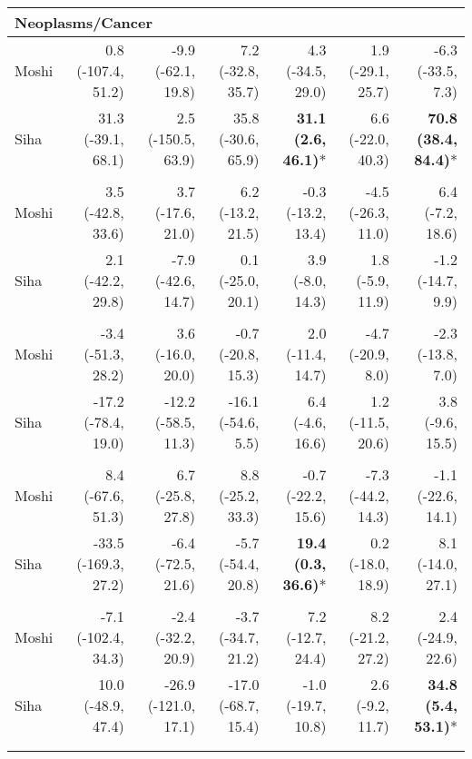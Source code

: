 \begin{table}[t]
\begin{tabular*}{\linewidth}{@{\extracolsep{\fill}}l|rrrrrr}
\multicolumn{7}{l}{Neoplasms/Cancer} \\[2.5pt] 
\midrule\addlinespace[2.5pt]
Moshi & 0.8 (-107.4, 51.2) & -9.9 (-62.1, 19.8) & 7.2 (-32.8, 35.7) & 4.3 (-34.5, 29.0) & 1.9 (-29.1, 25.7) & -6.3 (-33.5, 7.3) \\ 
Siha & 31.3 (-39.1, 68.1) & 2.5 (-150.5, 63.9) & 35.8 (-30.6, 65.9) & \textbf{31.1 (2.6, 46.1)}* & 6.6 (-22.0, 40.3) & \textbf{70.8 (38.4, 84.4)}* \\ 
\midrule\addlinespace[2.5pt]
\multicolumn{7}{l}{Other Cardiovascular Diseases} \\[2.5pt] 
\midrule\addlinespace[2.5pt]
Moshi & 3.5 (-42.8, 33.6) & 3.7 (-17.6, 21.0) & 6.2 (-13.2, 21.5) & -0.3 (-13.2, 13.4) & -4.5 (-26.3, 11.0) & 6.4 (-7.2, 18.6) \\ 
Siha & 2.1 (-42.2, 29.8) & -7.9 (-42.6, 14.7) & 0.1 (-25.0, 20.1) & 3.9 (-8.0, 14.3) & 1.8 (-5.9, 11.9) & -1.2 (-14.7, 9.9) \\ 
\midrule\addlinespace[2.5pt]
\multicolumn{7}{l}{Mild/Moderate Anemia} \\[2.5pt] 
\midrule\addlinespace[2.5pt]
Moshi & -3.4 (-51.3, 28.2) & 3.6 (-16.0, 20.0) & -0.7 (-20.8, 15.3) & 2.0 (-11.4, 14.7) & -4.7 (-20.9, 8.0) & -2.3 (-13.8, 7.0) \\ 
Siha & -17.2 (-78.4, 19.0) & -12.2 (-58.5, 11.3) & -16.1 (-54.6, 5.5) & 6.4 (-4.6, 16.6) & 1.2 (-11.5, 20.6) & 3.8 (-9.6, 15.5) \\ 
\midrule\addlinespace[2.5pt]
\multicolumn{7}{l}{Caries} \\[2.5pt] 
\midrule\addlinespace[2.5pt]
Moshi & 8.4 (-67.6, 51.3) & 6.7 (-25.8, 27.8) & 8.8 (-25.2, 33.3) & -0.7 (-22.2, 15.6) & -7.3 (-44.2, 14.3) & -1.1 (-22.6, 14.1) \\ 
Siha & -33.5 (-169.3, 27.2) & -6.4 (-72.5, 21.6) & -5.7 (-54.4, 20.8) & \textbf{19.4 (0.3, 36.6)}* & 0.2 (-18.0, 18.9) & 8.1 (-14.0, 27.1) \\ 
\midrule\addlinespace[2.5pt]
\multicolumn{7}{l}{Poisoning} \\[2.5pt] 
\midrule\addlinespace[2.5pt]
Moshi & -7.1 (-102.4, 34.3) & -2.4 (-32.2, 20.9) & -3.7 (-34.7, 21.2) & 7.2 (-12.7, 24.4) & 8.2 (-21.2, 27.2) & 2.4 (-24.9, 22.6) \\ 
Siha & 10.0 (-48.9, 47.4) & -26.9 (-121.0, 17.1) & -17.0 (-68.7, 15.4) & -1.0 (-19.7, 10.8) & 2.6 (-9.2, 11.7) & \textbf{34.8 (5.4, 53.1)}* \\ 
\midrule\addlinespace[2.5pt]
\multicolumn{7}{l}{Snake and Insect Bites} \\[2.5pt] 
\midrule\addlinespace[2.5pt]

\end{tabular*}
\end{table}
